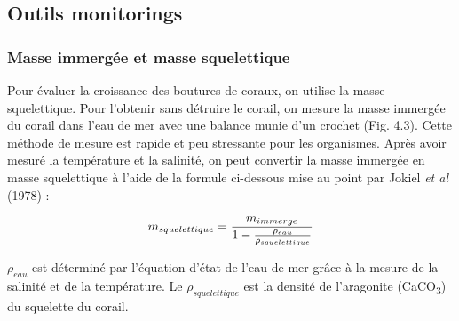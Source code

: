 \documentclass[]{article}
\begin{document}
\subsection{Outils monitorings}\label{outils-monitorings}

\subsubsection{Masse immergée et masse
squelettique}\label{masse-immergee-et-masse-squelettique}

Pour évaluer la croissance des boutures de coraux, on utilise la masse
squelettique. Pour l'obtenir sans détruire le corail, on mesure la masse
immergée du corail dans l'eau de mer avec une balance munie d'un crochet
(Fig. 4.3). Cette méthode de mesure est rapide et peu stressante pour
les organismes. Après avoir mesuré la température et la salinité, on
peut convertir la masse immergée en masse squelettique à l'aide de la
formule ci-dessous mise au point par Jokiel \emph{et al} (1978) :

\begin{equation}
\large
  m_{squelettique} = \frac {m_{immerge}}{ 1 - \frac{\rho_{eau}}{ \rho_{squelettique}}}
\end{equation}

\(\rho_{eau}\) est déterminé par l'équation d'état de l'eau de mer grâce
à la mesure de la salinité et de la température. Le
\(\rho_{squelettique}\) est la densité de l'aragonite
(CaCO\textsubscript{3}) du squelette du corail.
\end{document}
